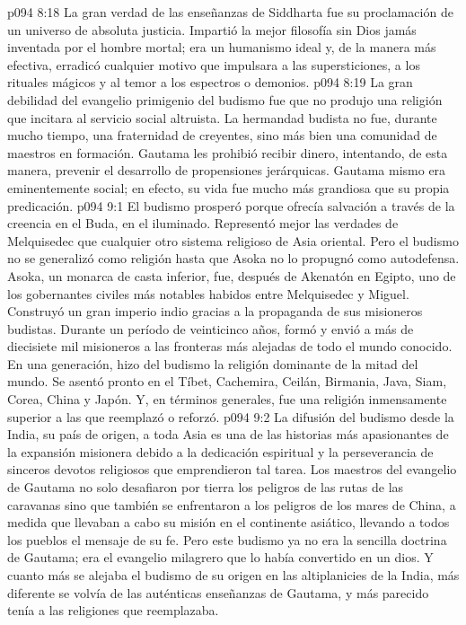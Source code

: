 \vs p094 8:18 La gran verdad de las enseñanzas de Siddharta fue su proclamación de un universo de absoluta justicia. Impartió la mejor filosofía sin Dios jamás inventada por el hombre mortal; era un humanismo ideal y, de la manera más efectiva, erradicó cualquier motivo que impulsara a las supersticiones, a los rituales mágicos y al temor a los espectros o demonios.
\vs p094 8:19 La gran debilidad del evangelio primigenio del budismo fue que no produjo una religión que incitara al servicio social altruista. La hermandad budista no fue, durante mucho tiempo, una fraternidad de creyentes, sino más bien una comunidad de maestros en formación. Gautama les prohibió recibir dinero, intentando, de esta manera, prevenir el desarrollo de propensiones jerárquicas. Gautama mismo era eminentemente social; en efecto, su vida fue mucho más grandiosa que su propia predicación.
\vs p094 9:1 El budismo prosperó porque ofrecía salvación a través de la creencia en el Buda, en el iluminado. Representó mejor las verdades de Melquisedec que cualquier otro sistema religioso de Asia oriental. Pero el budismo no se generalizó como religión hasta que Asoka no lo propugnó como autodefensa. Asoka, un monarca de casta inferior, fue, después de Akenatón en Egipto, uno de los gobernantes civiles más notables habidos entre Melquisedec y Miguel. Construyó un gran imperio indio gracias a la propaganda de sus misioneros budistas. Durante un período de veinticinco años, formó y envió a más de diecisiete mil misioneros a las fronteras más alejadas de todo el mundo conocido. En una generación, hizo del budismo la religión dominante de la mitad del mundo. Se asentó pronto en el Tíbet, Cachemira, Ceilán, Birmania, Java, Siam, Corea, China y Japón. Y, en términos generales, fue una religión inmensamente superior a las que reemplazó o reforzó.
\vs p094 9:2 La difusión del budismo desde la India, su país de origen, a toda Asia es una de las historias más apasionantes de la expansión misionera debido a la dedicación espiritual y la perseverancia de sinceros devotos religiosos que emprendieron tal tarea. Los maestros del evangelio de Gautama no solo desafiaron por tierra los peligros de las rutas de las caravanas sino que también se enfrentaron a los peligros de los mares de China, a medida que llevaban a cabo su misión en el continente asiático, llevando a todos los pueblos el mensaje de su fe. Pero este budismo ya no era la sencilla doctrina de Gautama; era el evangelio milagrero que lo había convertido en un dios. Y cuanto más se alejaba el budismo de su origen en las altiplanicies de la India, más diferente se volvía de las auténticas enseñanzas de Gautama, y más parecido tenía a las religiones que reemplazaba.
